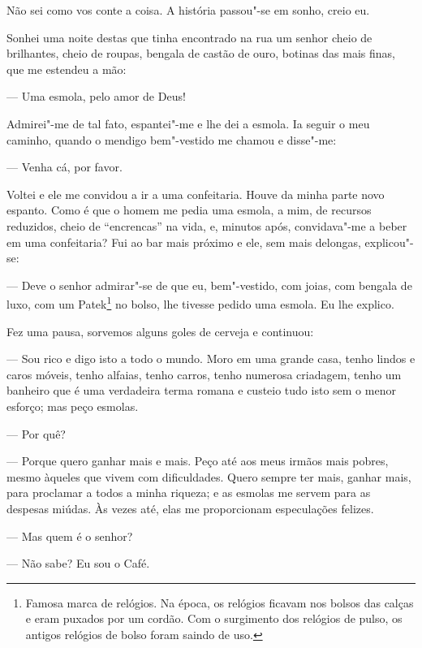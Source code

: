 Não sei como vos conte a coisa. A história passou"-se em sonho, creio eu.

Sonhei uma noite destas que tinha encontrado na rua um senhor cheio de
brilhantes, cheio de roupas, bengala de castão de ouro, botinas das mais
finas, que me estendeu a mão:

--- Uma esmola, pelo amor de Deus!

Admirei"-me de tal fato, espantei"-me e lhe dei a esmola. Ia seguir o meu
caminho, quando o mendigo bem"-vestido me chamou e disse"-me:

--- Venha cá, por favor.

Voltei e ele me convidou a ir a uma confeitaria. Houve da minha parte
novo espanto. Como é que o homem me pedia uma esmola, a mim, de recursos
reduzidos, cheio de ``encrencas'' na vida, e, minutos após, convidava"-me
a beber em uma confeitaria? Fui ao bar mais próximo e ele, sem mais
delongas, explicou"-se:

--- Deve o senhor admirar"-se de que eu, bem"-vestido, com joias, com
bengala de luxo, com um Patek\footnote{Famosa marca de relógios. Na
  época, os relógios ficavam nos bolsos das calças e eram puxados por um
  cordão. Com o surgimento dos relógios de pulso, os antigos relógios de
  bolso foram saindo de uso.} no bolso, lhe tivesse pedido uma esmola.
Eu lhe explico.

Fez uma pausa, sorvemos alguns goles de cerveja e continuou:

--- Sou rico e digo isto a todo o mundo. Moro em uma grande casa, tenho
lindos e caros móveis, tenho alfaias, tenho carros, tenho numerosa
criadagem, tenho um banheiro que é uma verdadeira terma romana e custeio
tudo isto sem o menor esforço; mas peço esmolas.

--- Por quê?

--- Porque quero ganhar mais e mais. Peço até aos meus irmãos mais
pobres, mesmo àqueles que vivem com dificuldades. Quero sempre ter mais,
ganhar mais, para proclamar a todos a minha riqueza; e as esmolas me
servem para as despesas miúdas. Às vezes até, elas me proporcionam
especulações felizes.

--- Mas quem é o senhor?

--- Não sabe? Eu sou o Café.




